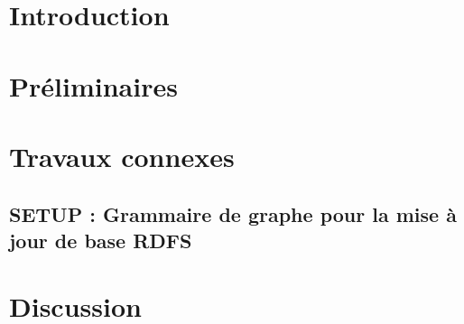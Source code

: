 \section{Introduction}


\section{Préliminaires}
\label{sec:update:pre}


\section{Travaux connexes}
\label{sec:update:soa}


\subsection{SETUP : Grammaire de graphe pour la mise à jour de base RDFS}
\label{sec:update:soa:sendup}


\section{Discussion}
\label{sec:update:discussion}

